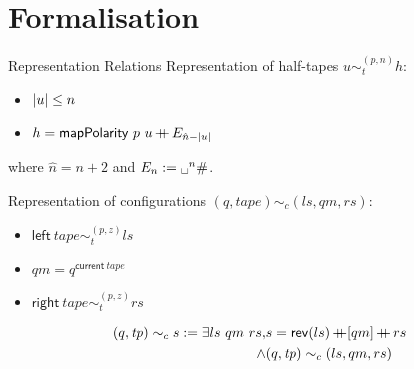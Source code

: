 \documentclass[11pt,usenames,dvipsnames,
hyperref={pdfencoding=auto,psdextra}]{beamer}
\newcommand{\reprtt}[2]{\ensuremath{\sim_t^{(#1, #2)}}}
\newcommand{\reprc}{\ensuremath{\sim_c}}
\newcommand{\blank}{\textbf{\textvisiblespace}}
\begin{document}
\section{Formalisation}

\begin{frame}{Representation Relations}
  Representation of half-tapes $u \reprtt{p}{n} h$:
  \begin{itemize}
    \item $|u| \le n$
    \item $h = \textsf{mapPolarity}~p~u \mathop{{+}\!\!\!{+}} E_{\hat{n} - |u|}$
  \end{itemize}
  where $\hat{n} = n + 2$ and $E_n := \blank^n \#$. 
  \vspace{2ex}

  Representation of configurations $(q, \mathit{tape}) \reprc{} (ls, qm, rs)$: 
  \begin{itemize}
    \item $\textsf{left}~\mathit{tape} \reprtt{p}{z} ls$
    \item $qm = q^{\textsf{current}~\mathit{tape}}$
    \item $\textsf{right}~\mathit{tape} \reprtt{p}{z} rs$
  \end{itemize}

  \begin{align*}
    (q, \mathit{tp}) \reprc{} s := \exists ls~qm~rs,& s = \rev{(ls)} \con [qm] \con rs \\
    \land &(q, \mathit{tp}) \reprc{} (ls, qm, rs)
  \end{align*}
\end{frame}
\end{document}
